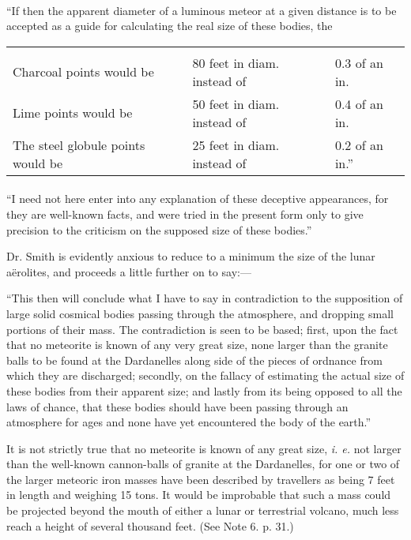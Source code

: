 \documentclass[a4paper, 12pt, oneside]{article}
\begin{document}
\paragraph{}
``If then the apparent diameter of a luminous meteor at a given distance is to be accepted as a guide for calculating the real size of these bodies, the
\begin{table}[H]
    \footnotesize
    \centering
    \Fontauri
    \begin{tabular}{l l l}
         &  &  \\ 
        Charcoal points would be & 80 feet in diam. instead of & 0.3 of an in. \\
        Lime points would be & 50 feet in diam. instead of & 0.4 of an in. \\
        The steel globule points would be & 25 feet in diam. instead of & 0.2 of an in.'' \\
    \end{tabular}
\end{table}
\paragraph{}
``I need not here enter into any explanation of these deceptive appearances, for they are well-known facts, and were tried in the present form only to give precision to the criticism on the supposed size of these bodies.''

Dr. Smith is evidently anxious to reduce to a minimum the size of the lunar aërolites, and proceeds a little further on to say:---

``This then will conclude what I have to say in contradiction to the supposition of large solid cosmical bodies passing through the atmosphere, and dropping small portions of their mass. The contradiction is seen to be based; first, upon the fact that no meteorite is known of any very great size, none larger than the granite balls to be found at the Dardanelles along side of the pieces of ordnance from which they are discharged; secondly, on the fallacy of estimating the actual size of these bodies from their apparent size; and lastly from its being opposed to all the laws of chance, that these bodies should have been passing through an atmosphere for ages and none have yet encountered the body of the earth.''

It is not strictly true that no meteorite is known of any great size, \emph{i. e.} not larger than the well-known cannon-balls of granite at the Dardanelles, for one or two of the larger meteoric iron masses have been described by travellers as being 7 feet in length and weighing 15 tons. It would be improbable that such a mass could be projected beyond the mouth of either a lunar or terrestrial volcano, much less reach a height of several thousand feet. (See Note 6. p. 31.)
\end{document}
